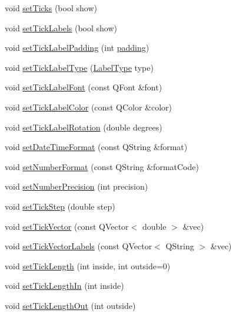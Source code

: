 \begin{DoxyCompactItemize}
void \hyperlink{class_q_c_p_axis_ac891409315bc379e3b1abdb162c1a011}{set\-Ticks} (bool show)
\item 
void \hyperlink{class_q_c_p_axis_a04ba16e1f6f78d70f938519576ed32c8}{set\-Tick\-Labels} (bool show)
\item 
void \hyperlink{class_q_c_p_axis_af302c479af9dbc2e9f0e44e07c0012ee}{set\-Tick\-Label\-Padding} (int \hyperlink{class_q_c_p_axis_abb85015a9467ec176e70698307ec833a}{padding})
\item 
void \hyperlink{class_q_c_p_axis_a54f24f5ce8feea25209388a863d7e448}{set\-Tick\-Label\-Type} (\hyperlink{class_q_c_p_axis_a4a7da0166f755f5abac23b765d184cad}{Label\-Type} type)
\item 
void \hyperlink{class_q_c_p_axis_a2b8690c4e8dbc39d9185d2b398ce7a6c}{set\-Tick\-Label\-Font} (const Q\-Font \&font)
\item 
void \hyperlink{class_q_c_p_axis_a395e445c3fe496b935bee7b911ecfd1c}{set\-Tick\-Label\-Color} (const Q\-Color \&color)
\item 
void \hyperlink{class_q_c_p_axis_a1bddd4413df8a576b7ad4b067fb33375}{set\-Tick\-Label\-Rotation} (double degrees)
\item 
void \hyperlink{class_q_c_p_axis_a2ee0191daa03524a682113e63e05f7a7}{set\-Date\-Time\-Format} (const Q\-String \&format)
\item 
void \hyperlink{class_q_c_p_axis_ae585a54dc2aac662e90a2ca82f002590}{set\-Number\-Format} (const Q\-String \&format\-Code)
\item 
void \hyperlink{class_q_c_p_axis_a21dc8023ad7500382ad9574b48137e63}{set\-Number\-Precision} (int precision)
\item 
void \hyperlink{class_q_c_p_axis_af727db0acc6492c4c774c0700e738205}{set\-Tick\-Step} (double step)
\item 
void \hyperlink{class_q_c_p_axis_a871db94c5d796c80fcbe1a9d4506e27e}{set\-Tick\-Vector} (const Q\-Vector$<$ double $>$ \&vec)
\item 
void \hyperlink{class_q_c_p_axis_a921d3ba3853ca3bd2cce3459f7a243ed}{set\-Tick\-Vector\-Labels} (const Q\-Vector$<$ Q\-String $>$ \&vec)
\item 
void \hyperlink{class_q_c_p_axis_a62ec40bebe3540e9c1479a8fd2be3b0d}{set\-Tick\-Length} (int inside, int outside=0)
\item 
void \hyperlink{class_q_c_p_axis_afae1a37a99611366275a51204d991739}{set\-Tick\-Length\-In} (int inside)
\item 
void \hyperlink{class_q_c_p_axis_a3b8a0debd1ffedd2c22d0592dfbb4e62}{set\-Tick\-Length\-Out} (int outside)

\end{DoxyCompactItemize}
